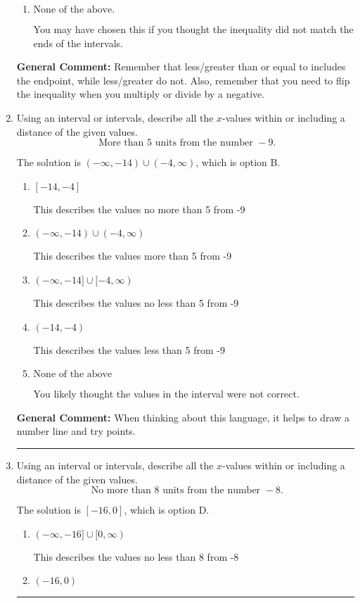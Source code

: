 \documentclass{extbook}[14pt]
\newcommand{\litem}[1]{\item #1

\rule{\textwidth}{0.4pt}}
\begin{document}
\begin{enumerate}
{\begin{enumerate}[label=\Alph*.]
 $(-0.5, \infty)$, which corresponds to negating the endpoint of the solution.
\item \( \text{None of the above}. \)

You may have chosen this if you thought the inequality did not match the ends of the intervals.
\end{enumerate}

\textbf{General Comment:} Remember that less/greater than or equal to includes the endpoint, while less/greater do not. Also, remember that you need to flip the inequality when you multiply or divide by a negative.
}
\litem{
Using an interval or intervals, describe all the $x$-values within or including a distance of the given values.
\[ \text{ More than } 5 \text{ units from the number } -9. \]

The solution is \( (-\infty, -14) \cup (-4, \infty) \), which is option B.\begin{enumerate}[label=\Alph*.]
\item \( [-14, -4] \)

This describes the values no more than 5 from -9
\item \( (-\infty, -14) \cup (-4, \infty) \)

This describes the values more than 5 from -9
\item \( (-\infty, -14] \cup [-4, \infty) \)

This describes the values no less than 5 from -9
\item \( (-14, -4) \)

This describes the values less than 5 from -9
\item \( \text{None of the above} \)

You likely thought the values in the interval were not correct.
\end{enumerate}

\textbf{General Comment:} When thinking about this language, it helps to draw a number line and try points.
}
\litem{
Using an interval or intervals, describe all the $x$-values within or including a distance of the given values.
\[ \text{ No more than } 8 \text{ units from the number } -8. \]

The solution is \( [-16, 0] \), which is option D.\begin{enumerate}[label=\Alph*.]
\item \( (-\infty, -16] \cup [0, \infty) \)

This describes the values no less than 8 from -8
\item \( (-16, 0) \)


\end{enumerate}}
\end{enumerate}
\end{document}
